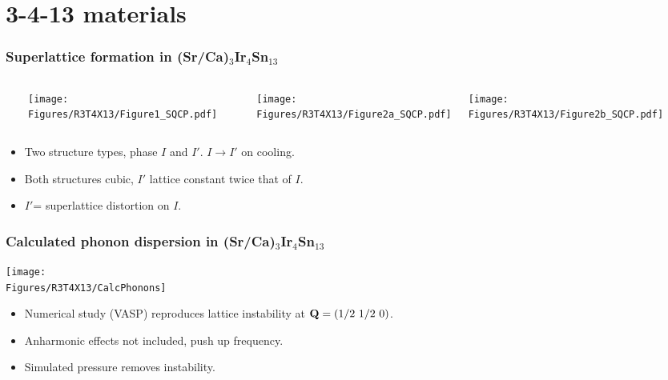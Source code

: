 \section{3-4-13 materials}
\begin{frame}[label=CIS-1]
\frametitle{Superlattice formation in (Sr/Ca)$_3$Ir$_4$Sn$_{13}$}

\begin{columns}[t]
\centerline{~}
\centerline{\texttt{[image: \\Figures/R3T4X13/Figure1\_SQCP.pdf]}}
\centerline{~}
\centerline{\texttt{[image: \\Figures/R3T4X13/Figure2a\_SQCP.pdf]}}
\centerline{\texttt{[image: \\Figures/R3T4X13/Figure2b\_SQCP.pdf]}}
\end{columns}

\begin{itemize}

\item
Two structure types, phase $I$ and $I'$. $I \rightarrow I'$ on cooling.

\item Both structures cubic, $I'$ lattice constant twice that of $I$.

\item $I'$= superlattice distortion on $I$. 

\end{itemize}

\end{frame}


\begin{frame}[label=CIS-phonons]
\frametitle{Calculated phonon dispersion in (Sr/Ca)$_3$Ir$_4$Sn$_{13}$}
\centerline{\texttt{[image: \\Figures/R3T4X13/CalcPhonons]}}
\begin{itemize}
\item
Numerical study (VASP) reproduces lattice instability at ${\bf Q} =
(1/2 ~ 1/2 ~ 0)$.
\item
Anharmonic effects not included, push up frequency.
\item 
Simulated pressure removes instability.
\end{itemize}
\end{frame}


